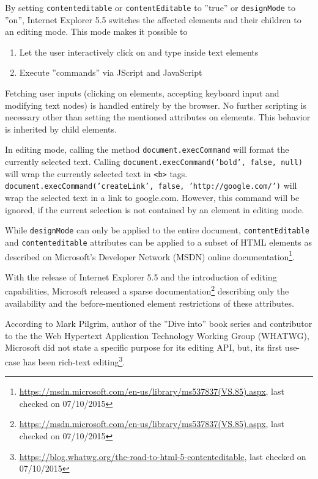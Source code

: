 By setting \texttt{contenteditable} or \texttt{contentEditable} to ''true'' or \texttt{designMode} to ''on'', Internet Explorer 5.5 switches the affected elements and their children to an editing mode. This mode makes it possible to

\begin{enumerate} \item Let the user interactively click on and type inside text elements \item Execute ''commands'' via JScript and JavaScript\end{enumerate}

Fetching user inputs (clicking on elements, accepting keyboard input and modifying text nodes) is handled entirely by the browser. No further scripting is necessary other than setting the mentioned attributes on elements. This behavior is inherited by child elements.

In editing mode, calling the method \texttt{document.execCommand} will format the currently selected text. Calling \texttt{document.execCommand('bold', false, null)} will wrap the currently selected text in \texttt{<b>} tags. \texttt{document.execCommand('createLink', false, 'http://google.com/')} will wrap the selected text in a link to google.com. However, this command will be ignored, if the current selection is not contained by an element in editing mode.

While \texttt{designMode} can only be applied to the entire document, \texttt{contentEditable} and \texttt{contenteditable}  attributes can be applied to a subset of HTML elements as described on Microsoft's Developer Network (MSDN) online documentation\footnote{\url{https://msdn.microsoft.com/en-us/library/ms537837(VS.85).aspx}, last checked on 07/10/2015}.

With the release of Internet Explorer 5.5 and the introduction of editing capabilities, Microsoft released a sparse documentation\footnote{\url{https://msdn.microsoft.com/en-us/library/ms537837(VS.85).aspx}, last checked on 07/10/2015} describing only the availability and the before-mentioned element restrictions of these attributes. 

According to Mark Pilgrim, author of the ''Dive into'' book series and contributor to the the Web Hypertext Application Technology Working Group (WHATWG), Microsoft did not state a specific purpose for its editing API, but, its first use-case has been rich-text editing\footnote{\url{https://blog.whatwg.org/the-road-to-html-5-contenteditable}, last checked on 07/10/2015}.

